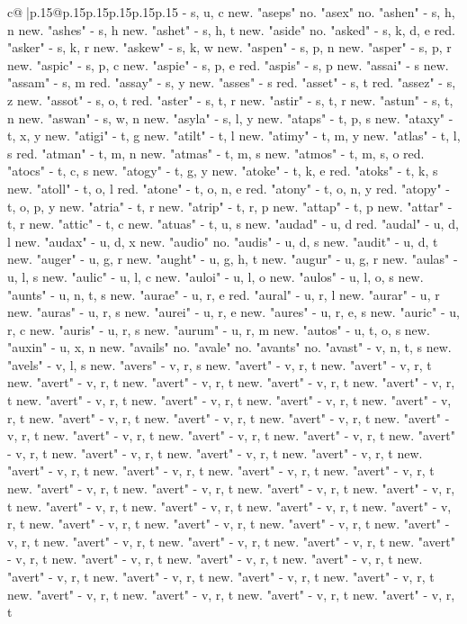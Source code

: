 \documentclass{article}
\begin{document}
{\begin{supertabular}{c@{$\;$}|p{.15\linewidth}@{}p{.15\linewidth}p{.15\linewidth}p{.15\linewidth}p{.15\linewidth}p{.15\linewidth}}
{{{{-} s, u, c new. "aseps" no. "asex" no. "ashen" {-} s, h, n new. "ashes" {-} s, h new. "ashet" {-} s, h, t new. "aside" no. "asked" {-} s, k, d, e red. "asker" {-} s, k, r new. "askew" {-} s, k, w new. "aspen" {-} s, p, n new. "asper" {-} s, p, r new. "aspic" {-} s, p, c new. "aspie" {-} s, p, e red. "aspis" {-} s, p new. "assai" {-} s new. "assam" {-} s, m red. "assay" {-} s, y new. "asses" {-} s red. "asset" {-} s, t red. "assez" {-} s, z new. "assot" {-} s, o, t red. "aster" {-} s, t, r new. "astir" {-} s, t, r new. "astun" {-} s, t, n new. "aswan" {-} s, w, n new. "asyla" {-} s, l, y new. "ataps" {-} t, p, s new. "ataxy" {-} t, x, y new. "atigi" {-} t, g new. "atilt" {-} t, l new. "atimy" {-} t, m, y new. "atlas" {-} t, l, s red. "atman" {-} t, m, n new. "atmas" {-} t, m, s new. "atmos" {-} t, m, s, o red. "atocs" {-} t, c, s new. "atogy" {-} t, g, y new. "atoke" {-} t, k, e red. "atoks" {-} t, k, s new. "atoll" {-} t, o, l red. "atone" {-} t, o, n, e red. "atony" {-} t, o, n, y red. "atopy" {-} t, o, p, y new. "atria" {-} t, r new. "atrip" {-} t, r, p new. "attap" {-} t, p new. "attar" {-} t, r new. "attic" {-} t, c new. "atuas" {-} t, u, s new. "audad" {-} u, d red. "audal" {-} u, d, l new. "audax" {-} u, d, x new. "audio" no. "audis" {-} u, d, s new. "audit" {-} u, d, t new. "auger" {-} u, g, r new. "aught" {-} u, g, h, t new. "augur" {-} u, g, r new. "aulas" {-} u, l, s new. "aulic" {-} u, l, c new. "auloi" {-} u, l, o new. "aulos" {-} u, l, o, s new. "aunts" {-} u, n, t, s new. "aurae" {-} u, r, e red. "aural" {-} u, r, l new. "aurar" {-} u, r new. "auras" {-} u, r, s new. "aurei" {-} u, r, e new. "aures" {-} u, r, e, s new. "auric" {-} u, r, c new. "auris" {-} u, r, s new. "aurum" {-} u, r, m new. "autos" {-} u, t, o, s new. "auxin" {-} u, x, n new. "avails" no. "avale" no. "avants" no. "avast" {-} v, n, t, s new. "avels" {-} v, l, s new. "avers" {-} v, r, s new. "avert" {-} v, r, t new. "avert" {-} v, r, t new. "avert" {-} v, r, t new. "avert" {-} v, r, t new. "avert" {-} v, r, t new. "avert" {-} v, r, t new. "avert" {-} v, r, t new. "avert" {-} v, r, t new. "avert" {-} v, r, t new. "avert" {-} v, r, t new. "avert" {-} v, r, t new. "avert" {-} v, r, t new. "avert" {-} v, r, t new. "avert" {-} v, r, t new. "avert" {-} v, r, t new. "avert" {-} v, r, t new. "avert" {-} v, r, t new. "avert" {-} v, r, t new. "avert" {-} v, r, t new. "avert" {-} v, r, t new. "avert" {-} v, r, t new. "avert" {-} v, r, t new. "avert" {-} v, r, t new. "avert" {-} v, r, t new. "avert" {-} v, r, t new. "avert" {-} v, r, t new. "avert" {-} v, r, t new. "avert" {-} v, r, t new. "avert" {-} v, r, t new. "avert" {-} v, r, t new. "avert" {-} v, r, t new. "avert" {-} v, r, t new. "avert" {-} v, r, t new. "avert" {-} v, r, t new. "avert" {-} v, r, t new. "avert" {-} v, r, t new. "avert" {-} v, r, t new. "avert" {-} v, r, t new. "avert" {-} v, r, t new. "avert" {-} v, r, t new. "avert" {-} v, r, t new. "avert" {-} v, r, t new. "avert" {-} v, r, t new. "avert" {-} v, r, t new. "avert" {-} v, r, t new. "avert" {-} v, r, t new. "avert" {-} v, r, t new. "avert" {-} v, r, t new. "avert" {-} v, r, t new. "avert" {-} v, r, t new. "avert" {-} v, r, t new. "avert" {-} v, r, t }}}
\end{supertabular}}
\end{document}
